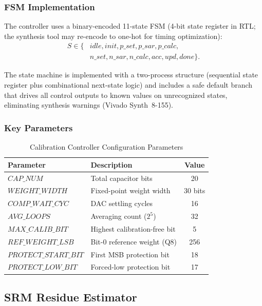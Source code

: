 \documentclass[journal]{IEEEtran}
\begin{document}
\subsubsection{FSM Implementation}

The controller uses a binary-encoded 11-state FSM (4-bit state register in RTL;
the synthesis tool may re-encode to one-hot for timing optimization):
\begin{align}
S \in \{&idle, init, p\_set, p\_sar, p\_calc, \nonumber\\
& n\_set, n\_sar, n\_calc, acc, upd, done\}.
\label{eq:fsm_states}
\end{align}

The state machine is implemented with a two-process structure (sequential state
register plus combinational next-state logic) and includes a safe default
branch that drives all control outputs to known values on unrecognized states,
eliminating synthesis warnings (Vivado Synth~8-155).

\subsubsection{Key Parameters}

\begin{table}[!t]
\centering
\caption{Calibration Controller Configuration Parameters}
\label{tab:calib_params}
\begin{tabular}{llc}
\toprule
Parameter & Description & Value \\
\midrule
$CAP\_NUM$ & Total capacitor bits & 20 \\
$WEIGHT\_WIDTH$ & Fixed-point weight width & 30 bits \\
$COMP\_WAIT\_CYC$ & DAC settling cycles & 16 \\
$AVG\_LOOPS$ & Averaging count ($2^5$) & 32 \\
$MAX\_CALIB\_BIT$ & Highest calibration-free bit & 5 \\
$REF\_WEIGHT\_LSB$ & Bit-0 reference weight (Q8) & 256 \\
$PROTECT\_START\_BIT$ & First MSB protection bit & 18 \\
$PROTECT\_LOW\_BIT$ & Forced-low protection bit & 17 \\
\bottomrule
\end{tabular}
\end{table}

\subsection{SRM Residue Estimator}
\label{sec:srm}
\end{document}
